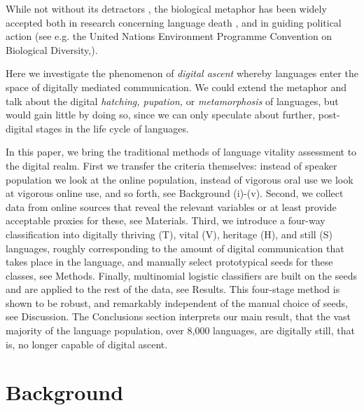 \documentclass[10pt]{article}
\begin{document}
While not without its detractors \cite{Frank:2008}, the
biological metaphor has been widely accepted both in research concerning 
language death \cite{Nettle:2000},\cite{Crystal:2002} and in 
guiding political action (see e.g. the United Nations Environment Programme
Convention on Biological Diversity,\cite{UN_biodiv:2004}). {\color{black}
Here we investigate the phenomenon of {\it digital ascent} whereby languages
enter the space of digitally mediated communication. We could 
extend the metaphor and talk about the digital {\it hatching,
  pupation,} or {\it metamorphosis} of languages, but would gain little 
by doing so, since we can only speculate about further,
post-digital stages in the life cycle of languages. 

In this paper, we bring the traditional methods of language vitality
assessment to the digital realm. First we transfer the criteria themselves:
instead of speaker population we look at the online population, instead of
vigorous oral use we look at vigorous online use, and so forth, see Background
(i)-(v). Second, we collect data from online sources that reveal the relevant
variables or at least provide acceptable proxies for these, see
Materials. Third, we introduce a four-way classification into digitally
thriving (T), vital (V), heritage (H), and still (S) languages, roughly
corresponding to the amount of digital communication that takes place in the
language, and manually select prototypical seeds for these classes, see
Methods. Finally, multinomial logistic classifiers are built on the seeds and
are applied to the rest of the data, see Results.  This four-stage method is
shown to be robust, and remarkably independent of the manual choice of seeds,
see Discussion. The Conclusions section interprets our main result, that the
vast majority of the language population, over 8,000 languages, are digitally
still, that is, no longer capable of digital ascent.

\section*{Background}
}
\end{document}
